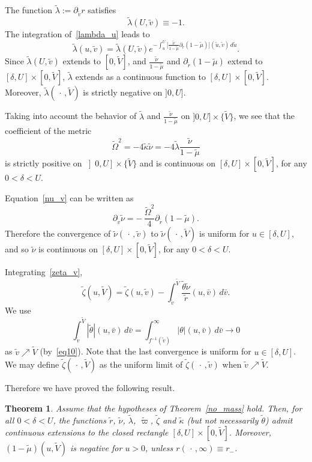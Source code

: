 \documentclass[a4paper,11pt,oneside,reqno]{amsart}
\newtheorem{Thm}{Theorem}[section]
\begin{document}
The function $\tilde\lambda:=\partial_{\tilde v} r$ satisfies
$$
\tilde{\lambda}(U,\tilde v)\equiv -1.
$$
The integration of~\eqref{lambda_u} leads to
$$
\tilde \lambda(u,\tilde v)=\tilde\lambda(U,\tilde v)e^{-\int_u^U\bigl[\frac{\tilde\nu}{1-\tilde\mu}
\partial_{\tilde r}(1-\tilde\mu)\bigr](\tilde u,\tilde v)\,d\tilde u}.
$$
Since $\tilde\lambda(U,\tilde v)$ extends to $[0,\tilde V]$, and
$\frac{\tilde\nu}{1-\tilde\mu}$ and $\partial_{\tilde r}(1-\tilde\mu)$ extend to
 $[\delta,U]\times[0,\tilde V]$, $\tilde\lambda$ extends as a continuous function to $[\delta,U]\times[0,\tilde V]$.
 Moreover, $\tilde\lambda(\,\cdot\,,\tilde V)$ is strictly negative on $]0,U]$.

Taking into account the behavior of $\tilde\lambda$ and $\frac{\tilde\nu}{1-\tilde\mu}$
on $]0,U]\times\{\tilde V\}$, we see that the coefficient of the metric 
$$
\tilde{\Omega}^2=-4\tilde\kappa\tilde\nu=-4\tilde\lambda\frac{\tilde\nu}{1-\tilde\mu}
$$
is strictly positive on $\left]0,U\right]\times\{\tilde V\}$ and is continuous on $[\delta,U]\times[0,\tilde V]$,
for any $0<\delta<U$.

Equation~\eqref{nu_v} can be written as 
$$
\partial_{\tilde v}\tilde{\nu}=-\,\frac{\tilde{\Omega}^2}{4}\partial_{\tilde r}(1-\tilde{\mu}).
$$
Therefore the convergence of $\tilde{\nu}(\,\cdot\,,\tilde v)$ to $\tilde{\nu}(\,\cdot\,,\tilde V)$
is uniform for $u \in [\delta,U]$, and so $\tilde{\nu}$ is continuous on
 $[\delta,U]\times[0,\tilde V]$, for any $0<\delta<U$.
 
 Integrating~\eqref{zeta_v},
 $$ 
 \tilde\zeta(u,\tilde V)=\tilde\zeta(u,\tilde v)-\int_{\tilde v}^{\tilde V}\frac{\tilde\theta\tilde\nu}{\tilde r}(u,\bar v)\,d\bar v.
 $$ 
 We use
 $$\int_{\tilde v}^{\tilde V}|\tilde\theta|(u,\bar v)\,d\bar v=\int_{f^{-1}(\tilde v)}^{\infty}|\theta|(u,\bar v)\,d\bar v\to 0$$
 as $\tilde v\nearrow \tilde V$ (by~\eqref{eq10}). Note that the last convergence is uniform for $u\in[\delta,U]$.
 We may define $\tilde\zeta(\,\cdot\,,\tilde V)$ 
 as the uniform limit of $\tilde\zeta(\,\cdot\,,\tilde v)$ when $\tilde v\nearrow \tilde V$.
 
Therefore we have proved the following result.
 
\begin{Thm}\label{fechado-0}
Assume that the hypotheses of\/ {\rm Theorem~\ref{no_mass}} hold.
Then, for all\/ $0<\delta<U$, the functions $\tilde r$, $\tilde\nu$, $\tilde\lambda$, $\tilde\varpi$,
$\tilde\zeta$ and $\tilde\kappa$ (but not necessarily $\tilde{\theta}$)
admit continuous extensions to the closed rectangle\/ $[\delta,U]\times[0,\tilde V]$.
Moreover, ${(1-\tilde\mu)}(u,\tilde V)$ is negative for $u>0$, unless $r(\,\cdot\,,\infty)\equiv r_-$.
\end{Thm}
\end{document}
